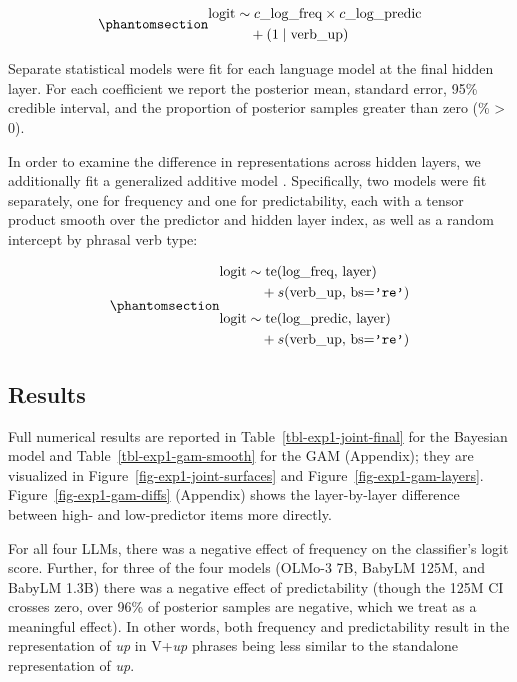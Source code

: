 \documentclass[11pt]{article}
\begin{document}
\begin{equation}\phantomsection\label{eq-linear-joint}{
\begin{aligned}
\text{logit} &\sim c\_\text{log\_freq} \times c\_\text{log\_predic} \\
             &\quad + (1 \mid \text{verb\_up})
\end{aligned}
}\end{equation}

Separate statistical models were fit for each language model at the
final hidden layer. For each coefficient we report the posterior mean,
standard error, 95\% credible interval, and the proportion of posterior
samples greater than zero (\% \textgreater{} 0).

In order to examine the difference in representations across hidden
layers, we additionally fit a generalized additive model
\citep{wood2017generalized}. Specifically, two models were fit
separately, one for frequency and one for predictability, each with a
tensor product smooth over the predictor and hidden layer index, as well
as a random intercept by phrasal verb type:

\begin{equation}\phantomsection\label{eq-gam-layers}{
\begin{aligned}
\text{logit} &\sim \mathrm{te}(\text{log\_freq},\, \text{layer}) \\
             &\quad + s(\text{verb\_up},\, \text{bs}{=}\texttt{'re'}) \\[4pt]
\text{logit} &\sim \mathrm{te}(\text{log\_predic},\, \text{layer}) \\
             &\quad + s(\text{verb\_up},\, \text{bs}{=}\texttt{'re'})
\end{aligned}
}\end{equation}

\subsection{Results}\label{results}

Full numerical results are reported in Table~\ref{tbl-exp1-joint-final}
for the Bayesian model and Table~\ref{tbl-exp1-gam-smooth} for the GAM
(Appendix); they are visualized in Figure~\ref{fig-exp1-joint-surfaces}
and Figure~\ref{fig-exp1-gam-layers}. Figure~\ref{fig-exp1-gam-diffs}
(Appendix) shows the layer-by-layer difference between high- and
low-predictor items more directly.

For all four LLMs, there was a negative effect of frequency on the
classifier's logit score. Further, for three of the four models (OLMo-3
7B, BabyLM 125M, and BabyLM 1.3B) there was a negative effect of
predictability (though the 125M CI crosses zero, over 96\% of posterior
samples are negative, which we treat as a meaningful effect). In other
words, both frequency and predictability result in the representation of
\emph{up} in V+\emph{up} phrases being less similar to the standalone
representation of \emph{up}.
\end{document}
